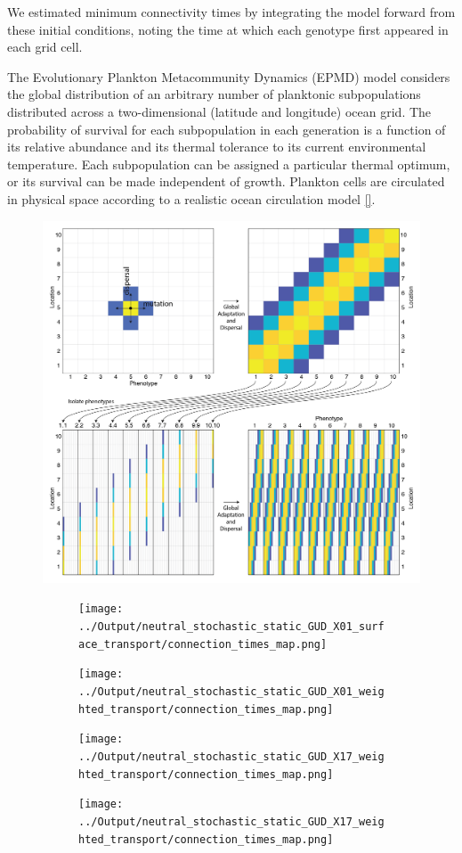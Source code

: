 \documentclass[12pt]{article}
\begin{document}
We estimated minimum connectivity times by integrating the model forward from these initial conditions, noting the time at which each genotype first appeared in each grid cell. 

The Evolutionary Plankton Metacommunity Dynamics (EPMD) model considers the global distribution of an arbitrary number of  planktonic subpopulations distributed across a two-dimensional (latitude and longitude) ocean grid. The probability of survival for each subpopulation in each generation is a function of its relative abundance and its thermal tolerance to its current environmental temperature. Each subpopulation can be assigned a particular thermal optimum, or its survival can be made independent of growth. Plankton cells are circulated in physical space according to a realistic ocean circulation model \ref{}. 


\begin{figure}[htp!]
\centering
\includegraphics[width=0.8\linewidth]{../Figures/Schematic.png}
\caption{}
\label{Schematic}
\end{figure}


\begin{figure}[htp!]
\begin{subfigure}{0.5\textwidth}
\texttt{[image: ../Output/neutral\_stochastic\_static\_GUD\_X01\_surface\_transport/connection\_times\_map.png]}
\end{subfigure}
\begin{subfigure}{0.5\textwidth}
\texttt{[image: ../Output/neutral\_stochastic\_static\_GUD\_X01\_weighted\_transport/connection\_times\_map.png]}
\end{subfigure}
\begin{subfigure}{0.5\textwidth}
\texttt{[image: ../Output/neutral\_stochastic\_static\_GUD\_X17\_weighted\_transport/connection\_times\_map.png]}
\end{subfigure}
\begin{subfigure}{0.5\textwidth}
\texttt{[image: ../Output/neutral\_stochastic\_static\_GUD\_X17\_weighted\_transport/connection\_times\_map.png]}
\end{subfigure}
\caption{}
\label{Schematic}
\end{figure}
\end{document}
